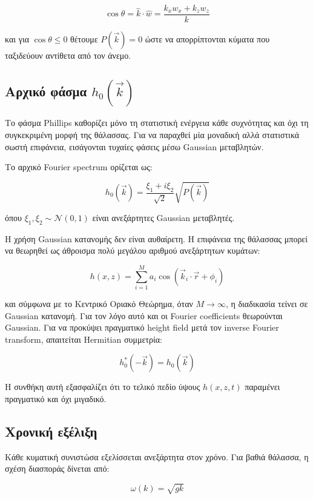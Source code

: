 \documentclass[a4paper, 11pt]{article}
\begin{document}
\[
\cos\theta
=
\hat{k}\cdot\hat{w}
=
\frac{k_xw_x + k_zw_z}{k}
\]

και για \(\cos\theta \le 0\) θέτουμε \(P(\vec{k}) = 0\) ώστε να
απορρίπτονται κύματα που ταξιδεύουν αντίθετα από τον άνεμο.

\subsection{\texorpdfstring{Αρχικό φάσμα
\(h_0(\vec{k})\)}{Αρχικό φάσμα h\_0(\textbackslash vec\{k\})}}\label{ux3b1ux3c1ux3c7ux3b9ux3baux3cc-ux3c6ux3acux3c3ux3bcux3b1-h_0veck}

Το φάσμα Phillips καθορίζει μόνο τη στατιστική ενέργεια κάθε συχνότητας
και όχι τη συγκεκριμένη μορφή της θάλασσας. Για να παραχθεί μία μοναδική
αλλά στατιστικά σωστή επιφάνεια, εισάγονται τυχαίες φάσεις μέσω Gaussian
μεταβλητών.

Το αρχικό Fourier spectrum ορίζεται ως:

\[
h_0(\vec{k})
=
\frac{\xi_1 + i\xi_2}{\sqrt{2}}
\sqrt{P(\vec{k})}
\]

όπου \(\xi_1,\xi_2 \sim \mathcal N(0,1)\) είναι ανεξάρτητες Gaussian
μεταβλητές.

Η χρήση Gaussian κατανομής δεν είναι αυθαίρετη. Η επιφάνεια της θάλασσας
μπορεί να θεωρηθεί ως άθροισμα πολύ μεγάλου αριθμού ανεξάρτητων κυμάτων:

\[
h(x,z)
=
\sum_{i=1}^{M}
a_i
\cos(\vec{k}_i\cdot\vec{r}+\phi_i)
\]

και σύμφωνα με το Κεντρικό Οριακό Θεώρημα, όταν \(M \to \infty\), η
διαδικασία τείνει σε Gaussian κατανομή. Για τον λόγο αυτό και οι Fourier
coefficients θεωρούνται Gaussian. Για να προκύψει πραγματικό height
field μετά τον inverse Fourier transform, απαιτείται Hermitian
συμμετρία:

\[
h_0^*(-\vec{k}) = h_0(\vec{k})
\]

Η συνθήκη αυτή εξασφαλίζει ότι το τελικό πεδίο ύψους \(h(x,z,t)\)
παραμένει πραγματικό και όχι μιγαδικό.

\subsection{Χρονική
εξέλιξη}\label{ux3c7ux3c1ux3bfux3bdux3b9ux3baux3ae-ux3b5ux3beux3adux3bbux3b9ux3beux3b7}

Κάθε κυματική συνιστώσα εξελίσσεται ανεξάρτητα στον χρόνο. Για βαθιά
θάλασσα, η σχέση διασποράς δίνεται από:

\[
\omega(k)=\sqrt{gk}
\]
\end{document}
